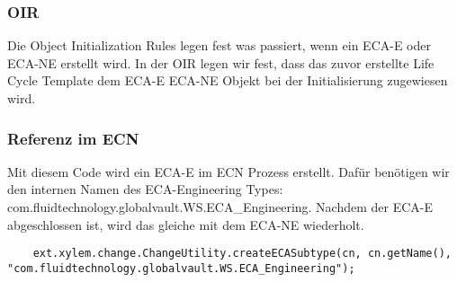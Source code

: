 \subsubsection*{OIR}
Die Object Initialization Rules legen fest was passiert, wenn ein ECA-E oder ECA-NE erstellt wird.
In der OIR legen wir fest, dass das zuvor erstellte Life Cycle Template dem ECA-E \bzw ECA-NE Objekt bei der Initialisierung zugewiesen wird.

\subsubsection*{Referenz im ECN}
Mit diesem Code wird ein ECA-E im ECN Prozess erstellt.
Dafür benötigen wir den internen Namen des ECA-Engineering Types: com.fluidtechnology.globalvault.WS.ECA\_Engineering.
Nachdem der ECA-E abgeschlossen ist, wird das gleiche mit dem ECA-NE wiederholt.
\begin{lstlisting}
    ext.xylem.change.ChangeUtility.createECASubtype(cn, cn.getName(), "com.fluidtechnology.globalvault.WS.ECA_Engineering");
\end{lstlisting}

